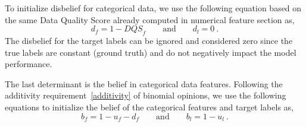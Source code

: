 

To initialize disbelief for categorical data, we use the following equation based on the same Data Quality Score already computed in numerical feature section as,
\begin{equation}
d_{f} = 1 - {DQS}_{f} \qquad \text{and} \qquad d_{l} = 0\ .
\label{cat_d}    
\end{equation}
The disbelief for the target labels can be ignored and considered zero since the true labels are constant (ground truth) and do not negatively impact the model performance.

The last determinant is the belief in categorical data features. Following the additivity requirement~\ref{additivity} of binomial opinions, we use the following equations to initialize the belief of the categorical features and target labels as,
\begin{equation}
b_{f} = 1 - u_{f} - d_{f} \qquad \text{and} \qquad b_l = 1 - u_{l}\ .
\label{cat_b}    
\end{equation}



